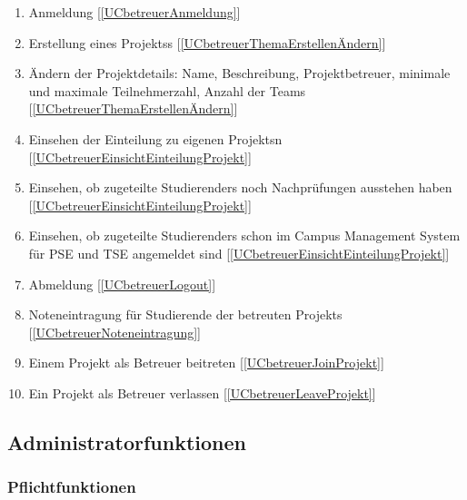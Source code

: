 \documentclass[parskip=full]{scrartcl}
\newcommand{\swtLabel}[1]{\textbf{/#1\arabic*0/}}
\newcommand{\testRef}[1]{[\ref{#1}]}
\begin{document}
\begin{enumerate}[label=\swtLabel{FA}, resume]
  \item Anmeldung  \label{FAbetreuerAnmeldung} \testRef{UCbetreuerAnmeldung}
  \item Erstellung eines \glspl{Projekt}s \label{FAbetreuerAddProjekt}
  \testRef{UCbetreuerThemaErstellenÄndern}
  \item Ändern der Projektdetails: Name, Beschreibung, Projektbetreuer,
        minimale und maximale Teilnehmerzahl, Anzahl der Teams
        \label{FAbetreuerChangeProjekt} \testRef{UCbetreuerThemaErstellenÄndern}%
  \item Einsehen der Einteilung zu eigenen \glspl{Projekt}n
  \label{FAbetreuerEinsichtEinteilung}
  \testRef{UCbetreuerEinsichtEinteilungProjekt}
  \item Einsehen, ob zugeteilte \glspl{Studierender} noch Nachprüfungen
  ausstehen haben \label{FAbetreuerEinsichtNachpruefung} \testRef{UCbetreuerEinsichtEinteilungProjekt}
  \item Einsehen, ob zugeteilte \glspl{Studierender} schon im Campus Management System für \gls{PSE} und TSE angemeldet sind
  \label{FAbetreuerEinsichtTSE} \testRef{UCbetreuerEinsichtEinteilungProjekt}
  \item Abmeldung \label{FAbetreuerAbmeldung} \testRef{UCbetreuerLogout}
  \item Noteneintragung für Studierende der betreuten \glspl{Projekt}
  \label{FAbetreuerNoten} \testRef{UCbetreuerNoteneintragung}
  \item Einem \gls{Projekt} als Betreuer beitreten \label{FAbetreuerJoinProjekt}
  \testRef{UCbetreuerJoinProjekt}
  \item Ein \gls{Projekt} als Betreuer verlassen \label{FAbetreuerLeaveprojekt}
  \testRef{UCbetreuerLeaveProjekt}

\end{enumerate}

\subsection{Administratorfunktionen}

\subsubsection{Pflichtfunktionen}
\end{document}
